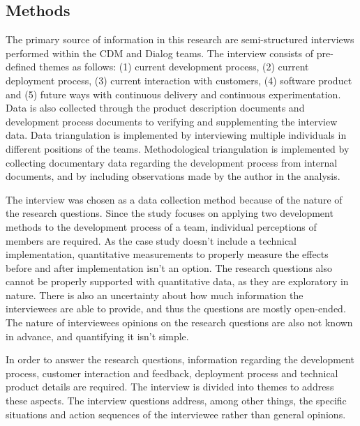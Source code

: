 \documentclass[english]{tktltiki2}
\theoremstyle{definition}
\theoremstyle{remark}
\begin{document}
\subsection{Methods} %
The primary source of information in this research are semi-structured interviews \cite{runeson2009guidelines} performed within the CDM and Dialog teams. The interview consists of pre-defined themes as follows: (1) current development process, (2) current deployment process, (3) current interaction with customers, (4) software product and (5) future ways with continuous delivery and continuous experimentation. Data is also collected through the product description documents and development process documents to verifying and supplementing the interview data. Data triangulation is implemented by interviewing multiple individuals in different positions of the teams. Methodological triangulation is implemented by collecting documentary data regarding the development process from internal documents, and by including observations made by the author in the analysis. 

The interview was chosen as a data collection method because of the nature of the research questions. Since the study focuses on applying two development methods to the development process of a team, individual perceptions of members are required. As the case study doesn't include a technical implementation, quantitative measurements to properly measure the effects before and after implementation isn't an option. The research questions also cannot be properly supported with quantitative data, as they are exploratory in nature. There is also an uncertainty about how much information the interviewees are able to provide, and thus the questions are mostly open-ended. The nature of interviewees opinions on the research questions are also not known in advance, and quantifying it isn't simple. 

In order to answer the research questions, information regarding the development process, customer interaction and feedback, deployment process and technical product details are required. The interview is divided into themes to address these aspects. The interview questions address, among other things, the specific situations and action sequences of the interviewee rather than general opinions. 
\end{document}
